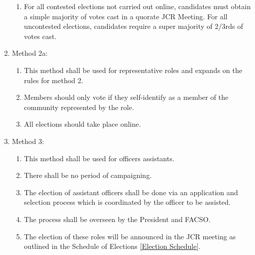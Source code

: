 \begin{enumerate}
\begin{enumerate}
        \item For all contested elections not carried out online, candidates must obtain a simple majority of votes cast in a quorate JCR Meeting. For all uncontested elections, candidates require a super majority of 2/3rds of votes cast.
    \end{enumerate}
        \item Method 2a:
    \begin{enumerate}
        \item This method shall be used for representative roles and expands on the rules for method 2.
        \item Members should only vote if they self-identify as a member of the community represented by the role. 
        \item All elections should take place online.
    \end{enumerate}
    \item Method 3:
    \begin{enumerate}
        \item This method shall be used for officers assistants.
        \item There shall be no period of campaigning.
        \item The election of assistant officers shall be done via an application and selection process which is coordinated by the officer to be assisted.
        \item The process shall be overseen by the President and FACSO.
        \item The election of these roles will be announced in the JCR meeting as outlined in the Schedule of Elections \ref{Election Schedule}.
    \end{enumerate}
\end{enumerate}



